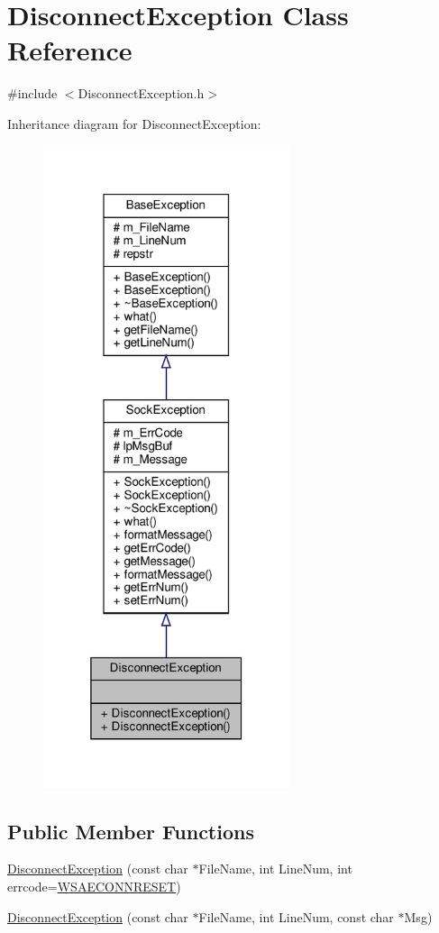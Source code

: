 \hypertarget{classDisconnectException}{}\section{Disconnect\+Exception Class Reference}
\label{classDisconnectException}


{\ttfamily \#include $<$Disconnect\+Exception.\+h$>$}



Inheritance diagram for Disconnect\+Exception\+:\nopagebreak
\begin{figure}[H]
\begin{center}
\leavevmode
\includegraphics[width=205pt]{classDisconnectException__inherit__graph}
\end{center}
\end{figure}
\subsection*{Public Member Functions}
\begin{DoxyCompactItemize}
\item 
\hyperlink{classDisconnectException_a83047c402b0a683f0d9ca5a424775510}{Disconnect\+Exception} (const char $\ast$File\+Name, int Line\+Num, int errcode=\hyperlink{sockclasslib_8h_a990acc876290fc28437b4cce88c897a8}{W\+S\+A\+E\+C\+O\+N\+N\+R\+E\+S\+ET})
\item 
\hyperlink{classDisconnectException_af47f56084a2c38ed629b4e0ea486a3dd}{Disconnect\+Exception} (const char $\ast$File\+Name, int Line\+Num, const char $\ast$Msg)
\end{DoxyCompactItemize}
